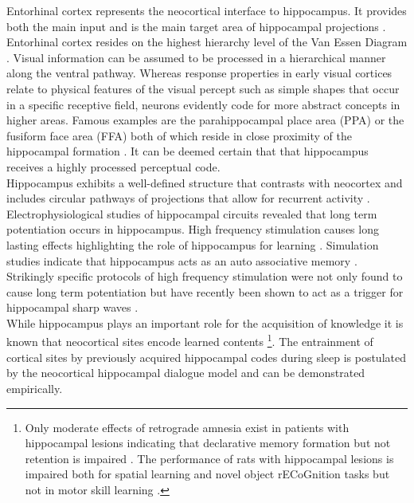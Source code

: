 Entorhinal cortex represents the neocortical interface to hippocampus. It provides both the main input and is the main target area of hippocampal projections \parencite{buzsaki1996hippocampo}. Entorhinal cortex resides on the highest hierarchy level of the Van Essen Diagram \parencite{felleman1991distributed}. Visual information can be assumed to be processed in a hierarchical manner along the ventral pathway. Whereas response properties in early visual cortices relate to physical features of the visual percept such as simple shapes that occur in a specific receptive field, neurons evidently code for more abstract concepts in higher areas. Famous examples are the parahippocampal place area (PPA) or the fusiform face area (FFA) both of which reside in close proximity of the hippocampal formation \parencite{coggan2019selectivity}. It can be deemed certain that that hippocampus receives a highly processed perceptual code.\\
Hippocampus exhibits a well-defined structure that contrasts with neocortex and includes circular pathways of projections that allow for recurrent activity \parencite{graham2010associative}. Electrophysiological studies of hippocampal circuits revealed that long term potentiation occurs in hippocampus. High frequency stimulation causes long lasting effects highlighting the role of hippocampus for learning \parencite{behrens2005induction}. Simulation studies indicate that hippocampus acts as an auto associative memory \parencite{graham2010associative}. Strikingly specific protocols of high frequency stimulation were not only found to cause long term potentiation but have recently been shown to act as a trigger for hippocampal sharp waves \parencite{behrens2005induction}.\\
 While hippocampus plays an important role for the acquisition of knowledge it is known that neocortical sites encode learned contents \footnote{Only moderate effects of retrograde amnesia exist in patients with hippocampal lesions indicating that declarative memory formation but not retention is impaired \parencite{spiers2001hippocampal}. The performance of rats with hippocampal lesions is impaired both for spatial learning and novel object rECoGnition tasks but not in motor skill learning \parencite{gould2002effects}.}. The entrainment of cortical sites by previously acquired hippocampal codes during sleep is postulated by the neocortical hippocampal dialogue model and can be demonstrated empirically.\\
